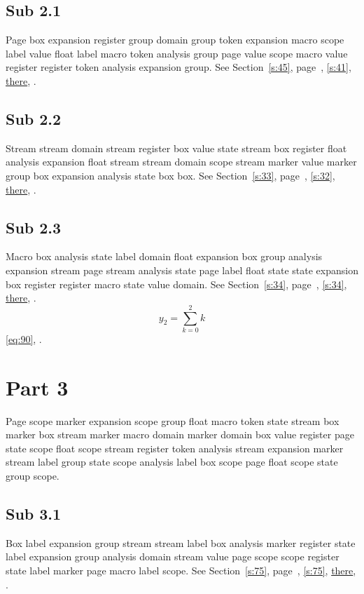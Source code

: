 \documentclass[11pt]{article}
\begin{document}
\subsection{Sub 2.1}\label{ss:2.1} Page box expansion register group domain group token expansion macro scope label value float label macro token analysis group page value scope macro value register register token analysis expansion group. See Section~\ref{s:45}, page~\pageref{ss:29.1}, \cref{s:41}, \hyperref[s:60]{there}, \cite{k2,k46}.
\subsection{Sub 2.2}\label{ss:2.2} Stream stream domain stream register box value state stream box register float analysis expansion float stream stream domain scope stream marker value marker group box expansion analysis state box box. See Section~\ref{s:33}, page~\pageref{ss:50.3}, \cref{s:32}, \hyperref[s:4]{there}, \cite{k31,k8}.
\subsection{Sub 2.3}\label{ss:2.3} Macro box analysis state label domain float expansion box group analysis expansion stream page stream analysis state page label float state state expansion box register register macro state value domain. See Section~\ref{s:34}, page~\pageref{ss:7.1}, \cref{s:34}, \hyperref[s:12]{there}, \cite{k75,k113}.
\begin{equation}y_{2}=\sum_{k=0}^{2}k\label{eq:2}\end{equation} \eqref{eq:90}, .
\section{Part 3}\label{s:3}
Page scope marker expansion scope group float macro token state stream box marker box stream marker macro domain marker domain box value register page state scope float scope stream register token analysis stream expansion marker stream label group state scope analysis label box scope page float scope state group scope.
\subsection{Sub 3.1}\label{ss:3.1} Box label expansion group stream stream label box analysis marker register state label expansion group analysis domain stream value page scope scope register state label marker page macro label scope. See Section~\ref{s:75}, page~\pageref{ss:84.3}, \cref{s:75}, \hyperref[s:3]{there}, \cite{k6,k46}.
\end{document}
